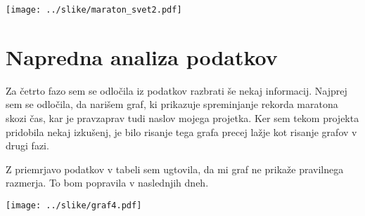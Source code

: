 \documentclass[11pt,a4paper]{article}
\begin{document}
\texttt{[image: ../slike/maraton\_svet2.pdf]}

\section{Napredna analiza podatkov}

Za četrto fazo sem se odločila iz podatkov razbrati še nekaj informacij. Najprej sem se odločila, da narišem graf, ki prikazuje spreminjanje rekorda maratona skozi čas, kar je pravzaprav tudi naslov mojega projetka. Ker sem tekom projekta pridobila nekaj izkušenj, je bilo risanje tega grafa precej lažje kot risanje grafov v drugi fazi.

Z priemrjavo podatkov v tabeli sem ugtovila, da mi graf ne prikaže pravilnega razmerja. To bom popravila v naslednjih dneh.

\texttt{[image: ../slike/graf4.pdf]}
\end{document}
